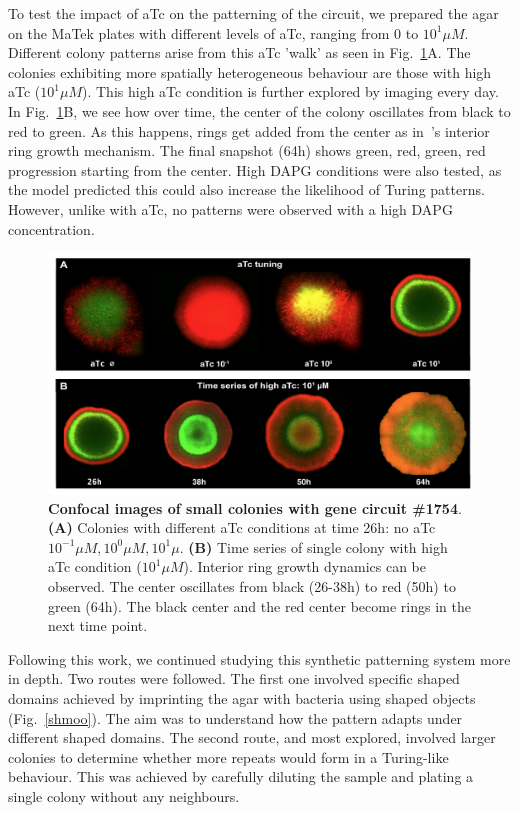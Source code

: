 To test the impact of aTc on the patterning of the circuit, we prepared the agar on the MaTek plates with different levels of aTc, ranging from 0 to $10^1 \mu M$.
Different colony patterns arise from this aTc 'walk' as seen in Fig.~\ref{atcwalk_timeseries_confocal}A.
The colonies exhibiting more spatially heterogeneous behaviour are those with high aTc ($10^1 \mu M$).
This high aTc condition is further explored by imaging every day.
In Fig.~\ref{atcwalk_timeseries_confocal}B, we see how over time, the center of the colony oscillates from black to red to green.
As this happens, rings get added from the center as in~\cite{Konow2019}'s interior ring growth mechanism.
The final snapshot (64h) shows green, red, green, red progression starting from the center.
High DAPG conditions were also tested, as the model predicted this could also increase the likelihood of Turing patterns.
However, unlike with aTc, no patterns were observed with a high DAPG concentration.
\begin{figure}[H]

    \includegraphics[width=1\textwidth]{chapters/Chapter 3/atcwalk_timeseries_confocal}
    \caption{\textbf{Confocal images of small colonies with gene circuit \#1754}. \textbf{(A)} Colonies with different aTc conditions at time 26h: no aTc $10^{-1} \mu M,10^{0} \mu M,10^{1} \mu  $. \textbf{(B)} Time series of single colony with high aTc condition ($10^1 \mu M$). Interior ring growth dynamics can be observed. The center oscillates from black (26-38h) to red (50h) to green (64h). The black center and the red center become rings in the next time point. }
    \label{atcwalk_timeseries_confocal}
\end{figure}

Following this work, we continued studying this synthetic patterning system more in depth.
Two routes were followed.
The first one involved specific shaped domains achieved by imprinting the agar with bacteria using shaped objects (Fig.~\ref{shmoo}).
The aim was to understand how the pattern adapts under different shaped domains.
The second route, and most explored, involved larger colonies to determine whether more repeats would form in a Turing-like behaviour.
This was achieved by carefully diluting the sample and plating a single colony without any neighbours.

